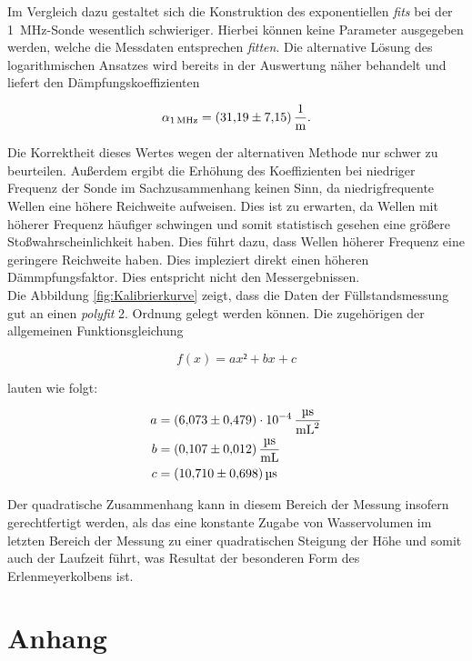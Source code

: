 \noindent Im Vergleich dazu gestaltet sich die Konstruktion des exponentiellen \emph{fits} bei der \qty{1}{\mega\hertz}-Sonde wesentlich 
schwieriger. Hierbei können keine Parameter ausgegeben werden, welche die Messdaten entsprechen \emph{fitten}. Die alternative Lösung des 
logarithmischen Ansatzes wird bereits in der Auswertung näher behandelt und liefert den Dämpfungskoeffizienten

\begin{align*}
    \alpha_{\qty{1}{\mega\hertz}} = \qty{31.19\pm7.15}{\per\meter}.
\end{align*}

\noindent Die Korrektheit dieses Wertes wegen der alternativen Methode nur schwer zu beurteilen. Außerdem ergibt die Erhöhung des 
Koeffizienten bei niedriger Frequenz der Sonde im Sachzusammenhang keinen Sinn, da niedrigfrequente Wellen 
eine höhere Reichweite aufweisen. Dies ist zu erwarten, da Wellen mit höherer Frequenz häufiger schwingen und somit statistisch 
gesehen eine größere Stoßwahrscheinlichkeit haben. Dies führt dazu, dass Wellen höherer Frequenz eine geringere Reichweite haben. Dies 
impleziert direkt einen höheren Dämmpfungsfaktor. Dies entspricht nicht den Messergebnissen.\\

\noindent Die Abbildung \ref{fig:Kalibrierkurve} zeigt, dass die Daten der Füllstandsmessung gut an einen \emph{polyfit} 2.
Ordnung gelegt werden können. Die zugehörigen der allgemeinen Funktionsgleichung

\begin{equation*}
    f(x) = ax² + bx + c
\end{equation*}

\noindent lauten wie folgt:

\begin{align*}
    a &= \qty{6.073\pm0.479e-4}{\micro\second\per\milli\liter\squared}\\  
    b &= \qty{0.107\pm0.012}{\micro\second\per\milli\liter}\\
    c &= \qty{10.71\pm0.698}{\micro\second }
\end{align*}

\noindent Der quadratische Zusammenhang kann in diesem Bereich der Messung insofern gerechtfertigt werden, als das eine konstante 
Zugabe von Wasservolumen im letzten Bereich der Messung zu einer quadratischen Steigung der Höhe und somit auch der Laufzeit 
führt, was Resultat der besonderen Form des Erlenmeyerkolbens ist. 

\section{Anhang}

